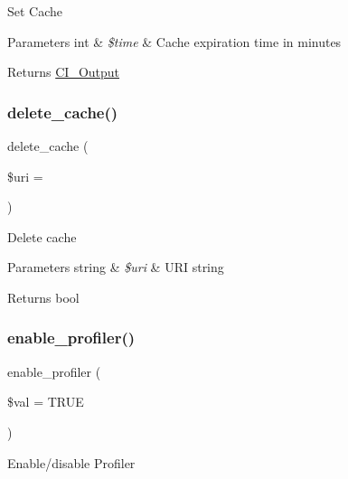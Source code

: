 Set Cache


\begin{DoxyParams}[1]{Parameters}
int & {\em \$time} & Cache expiration time in minutes \\
\hline
\end{DoxyParams}
\begin{DoxyReturn}{Returns}
\mbox{\hyperlink{class_c_i___output}{C\+I\+\_\+\+Output}} 
\end{DoxyReturn}
\mbox{\label{class_c_i___output_a475c83a7e4d2f7162032c01279c161b4}} 
\subsubsection{\texorpdfstring{delete\+\_\+cache()}{delete\_cache()}}
{\footnotesize\ttfamily delete\+\_\+cache (\begin{DoxyParamCaption}\item[{}]{\$uri = {\ttfamily \textquotesingle{}\textquotesingle{}} }\end{DoxyParamCaption})}

Delete cache


\begin{DoxyParams}[1]{Parameters}
string & {\em \$uri} & U\+RI string \\
\hline
\end{DoxyParams}
\begin{DoxyReturn}{Returns}
bool 
\end{DoxyReturn}
\mbox{\label{class_c_i___output_a7bd693db25952e1b074630f52ee67500}} 
\subsubsection{\texorpdfstring{enable\+\_\+profiler()}{enable\_profiler()}}
{\footnotesize\ttfamily enable\+\_\+profiler (\begin{DoxyParamCaption}\item[{}]{\$val = {\ttfamily TRUE} }\end{DoxyParamCaption})}

Enable/disable Profiler


